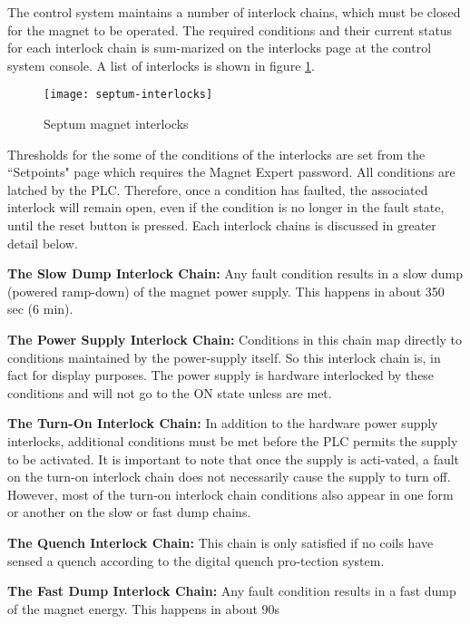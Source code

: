 The control system maintains a number of interlock chains, which must be closed for the magnet to be 
operated.  The required conditions and their current status for each interlock chain is sum-marized on 
the interlocks page at the control system console.  A list of interlocks is shown in figure \ref{fig:septum-inter}.

\begin{figure}[tbp]
\begin{center}
\texttt{[image: septum-interlocks]}
\caption[Septum: Interlocks]{Septum magnet interlocks}  
\label{fig:septum-inter}
\end{center}
\end{figure}


Thresholds for the some of the conditions of the interlocks are set from the ``Setpoints" page which requires 
the Magnet Expert password.  All conditions are latched by the PLC.  Therefore, once a condition has faulted, 
the associated interlock will remain open, even if the condition is no longer in the fault state, until the 
reset button is pressed.  Each interlock chains is discussed in greater detail below.


{\bf The Slow Dump Interlock Chain:}
Any fault condition results in a slow dump (powered ramp-down) of the magnet power supply.  This happens 
in about 350 sec (6 min).


{\bf The Power Supply Interlock Chain:}
Conditions in this chain map directly to conditions maintained by the power-supply itself.  So this interlock 
chain is, in fact for display purposes.  The power supply is hardware interlocked by these conditions and will 
not go to the ON state unless are met. 


{\bf The Turn-On Interlock Chain:}
In addition to the hardware power supply interlocks, additional conditions must be met before the PLC permits 
the supply to be activated.  It is important to note that once the supply is acti-vated, a fault on the turn-on 
interlock chain does not necessarily cause the supply to turn off.  However, most of the turn-on interlock 
chain conditions also appear in one form or another on the slow or fast dump chains.


{\bf The Quench Interlock Chain:}
This chain is only satisfied if no coils have sensed a quench according to the digital quench pro-tection system.


{\bf The Fast Dump Interlock Chain:}
Any fault condition results in a fast dump of the magnet energy.  This happens in about 90s

